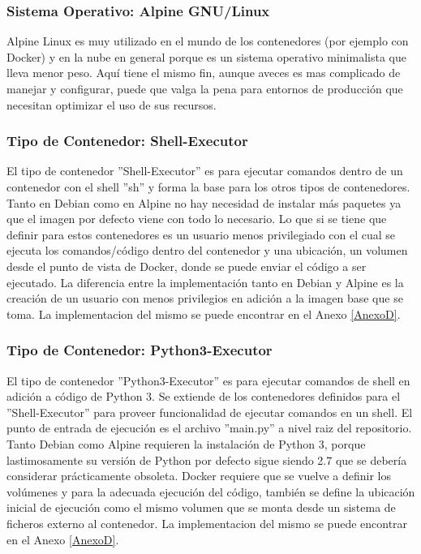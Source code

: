 \subsubsection{Sistema Operativo: Alpine GNU/Linux}
Alpine Linux es muy utilizado en el mundo de los contenedores (por ejemplo con Docker) y en la nube en general porque es un sistema operativo minimalista que lleva menor peso. Aquí tiene el mismo fin, aunque aveces es mas complicado de manejar y configurar, puede que valga la pena para entornos de producción que necesitan optimizar el uso de sus recursos.

\subsubsection{Tipo de Contenedor: Shell-Executor}
El tipo de contenedor ''Shell-Executor'' es para ejecutar comandos dentro de un contenedor con el shell ''sh'' y forma la base para los otros tipos de contenedores. Tanto en Debian como en Alpine no hay necesidad de instalar más paquetes ya que el imagen por defecto viene con todo lo necesario. Lo que si se tiene que definir para estos contenedores es un usuario menos privilegiado con el cual se ejecuta los comandos/código dentro del contenedor y una ubicación, un volumen desde el punto de vista de Docker, donde se puede enviar el código a ser ejecutado. La diferencia entre la implementación tanto en Debian y Alpine es la creación de un usuario con menos privilegios en adición a la imagen base que se toma. La implementacion del mismo se puede encontrar en el Anexo \ref{AnexoD}.

\subsubsection{Tipo de Contenedor: Python3-Executor}
El tipo de contenedor ''Python3-Executor'' es para ejecutar comandos de shell en adición a código de Python 3. Se extiende de los contenedores definidos para el ''Shell-Executor'' para proveer funcionalidad de ejecutar comandos en un shell. El punto de entrada de ejecución es el archivo ''main.py'' a nivel raiz del repositorio. Tanto Debian como Alpine requieren la instalación de Python 3, porque lastimosamente su versión de Python por defecto sigue siendo 2.7 que se debería considerar prácticamente obsoleta. Docker requiere que se vuelve a definir los volúmenes y para la adecuada ejecución del código, también se define la ubicación inicial de ejecución como el mismo volumen que se monta desde un sistema de ficheros externo al contenedor. La implementacion del mismo se puede encontrar en el Anexo \ref{AnexoD}.

